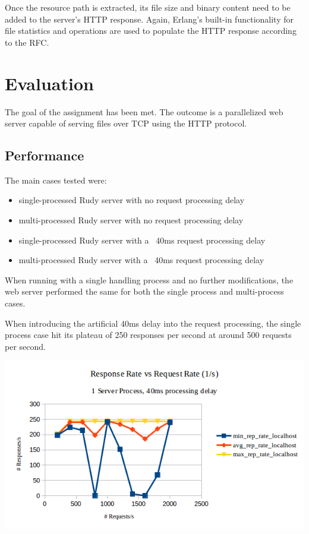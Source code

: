 \documentclass[a4paper, 11pt]{article}
\begin{document}
Once the resource path is extracted, its file size and binary content need to be added to the server's HTTP response. Again, Erlang's built-in functionality for file statistics and operations are used to populate the HTTP response according to the RFC.

\section{Evaluation}
The goal of the assignment has been met. The outcome is a parallelized web server capable of serving files over TCP using the HTTP protocol.

\subsection{Performance}
The main cases tested were:
\begin{itemize}
    \item single-processed Rudy server with no request processing delay
    \item multi-processed Rudy server with no request processing delay
    \item single-processed Rudy server with a ~40ms request processing delay
    \item multi-processed Rudy server with a ~40ms request processing delay
\end{itemize}

When running with a single handling process and no further modifications, the web server performed the same for both the single process and multi-process cases.

When introducing the artificial 40ms delay into the request processing, the single process case hit its plateau of 250 responses per second at around 500 requests per second.

\includegraphics{fig-2-1proc-delay.png}
\end{document}
